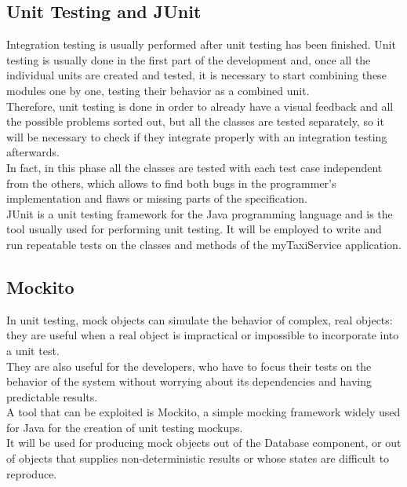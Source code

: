 \documentclass[18pt,oneside,a4paper, titlepage]{article}
\begin{document}
	\subsection{Unit Testing and JUnit}
		Integration testing is usually performed after unit testing has been finished. Unit testing is usually done in the first part of the development and, once all the individual units are created and tested, it is necessary to start combining these modules one by one, testing their behavior as a combined unit.\\
		Therefore, unit testing is done in order to already have a visual feedback and all the possible problems sorted out, but all the classes are tested separately, so it will be necessary to check if they integrate properly with an integration testing afterwards.\\
		In fact, in this phase all the classes are tested with each test case independent from the others, which allows to find both bugs in the programmer's implementation and flaws or missing parts of the specification. \\
		JUnit is a unit testing framework for the Java programming language and is the tool usually used for performing unit testing. It will be employed to write and run repeatable tests on the classes and methods of the myTaxiService application.
		
	\subsection{Mockito}
		In unit testing, mock objects can simulate the behavior of complex, real objects: they are useful when a real object is impractical or impossible to incorporate into a unit test.\\ They are also useful for the developers, who have to focus their tests on the behavior of the system without worrying about its dependencies and having  predictable results.\\
		A tool that can be exploited is Mockito, a simple mocking framework widely used for Java for the creation of unit testing mockups. \\
		It will be used for producing mock objects out of the Database component, or out of objects that supplies non-deterministic results or whose states are difficult to reproduce.
	
\end{document}
